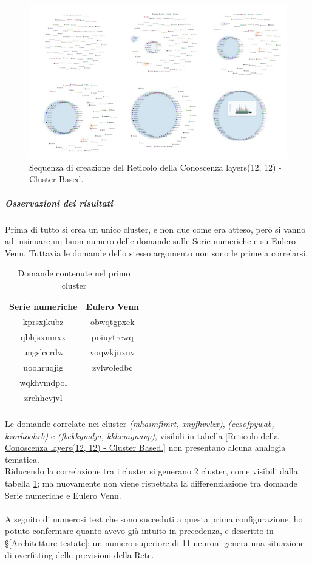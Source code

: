 \begin{figure}[H]
\centering
	\includegraphics[width=0.70\linewidth]{./image/collage_reticolo-logica(12,12).png}
	\caption{Sequenza di creazione del Reticolo della Conoscenza layers(12, 12) - Cluster Based.}
	\label{Sequenza di creazione del Reticolo della Conoscenza layers(12, 12) - Cluster Based.}
\end{figure}
\noindent
\subparagraph{Osservazioni dei risultati}\mbox{}
\noindent
Prima di tutto si crea un unico cluster, e non due come era atteso, però si vanno ad insinuare un buon numero delle domande sulle Serie numeriche e su Eulero Venn. Tuttavia le domande dello stesso argomento non sono le prime a correlarsi.
\begin{longtable}{|c|c|}
	\hline
	\textbf{Serie numeriche} & \textbf{Eulero Venn} \\\hline\hline
	kprsxjkubz & obwqtgpxek \\
	qbhjsxmnxx & poiuytrewq \\
	ungslccrdw & voqwkjnxuv \\ 
	uoohruqjig & zvlwoledbc \\
	wqkhvmdpol & \\
	zrehhcvjvl & \\
\hline
\caption{Domande contenute nel primo cluster}\label{tab:Domande contenute nel primo cluster}
\end{longtable}
\noindent
Le domande correlate nei cluster \textit{(mhaimflmrt, xnyfhvvlzx)}, \textit{(ccsofpywab, kzorhoohrb)} e \textit{(fbekkymdja, kkhcmynavp)}, visibili in tabella \ref{Reticolo della Conoscenza layers(12, 12) - Cluster Based.}  non presentano alcuna analogia tematica. \\
Riducendo la correlazione tra i cluster si generano 2 cluster, come visibili dalla tabella \ref{Sequenza di creazione del Reticolo della Conoscenza layers(12, 12) - Cluster Based.}; ma nuovamente non viene rispettata la differenziazione tra domande Serie numeriche e Eulero Venn.\\\\
A seguito di numerosi test che sono succeduti a questa prima configurazione, ho potuto confermare quanto avevo gi\`a intuito in precedenza, e descritto in §\ref{Architetture testate}: un numero superiore di 11 neuroni genera una situazione di overfitting delle previsioni della Rete.


